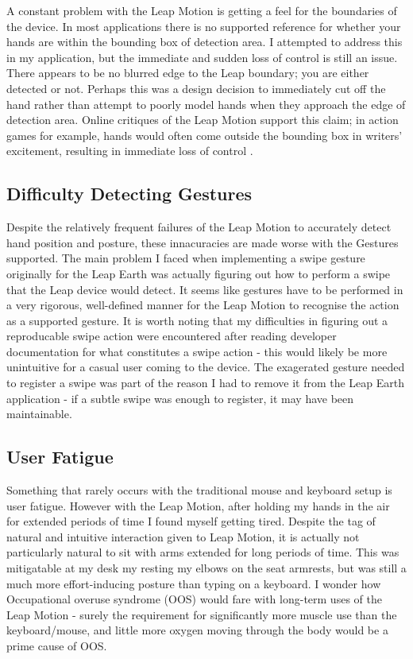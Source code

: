 \documentclass{sigplanconf}
\begin{document}
A constant problem with the Leap Motion is getting a feel for the boundaries of the device. In most applications there is no supported reference for whether your hands are within the bounding box of detection area. I attempted to address this in my application, but the immediate and sudden loss of control is still an issue. There appears to be no blurred edge to the Leap boundary; you are either detected or not. Perhaps this was a design decision to immediately cut off the hand rather than attempt to poorly model hands when they approach the edge of detection area. Online critiques of the Leap Motion support this claim; in action games for example, hands would often come outside the bounding box in writers' excitement, resulting in immediate loss of control \cite{}. 

\subsection{Difficulty Detecting Gestures}

Despite the relatively frequent failures of the Leap Motion to accurately detect hand position and posture, these innacuracies are made worse with the Gestures supported. The main problem I faced when implementing a swipe gesture originally for the Leap Earth was actually figuring out how to perform a swipe that the Leap device would detect. It seems like gestures have to be performed in a very rigorous, well-defined manner for the Leap Motion to recognise the action as a supported gesture. It is worth noting that my difficulties in figuring out a reproducable swipe action were encountered after reading developer documentation for what constitutes a swipe action - this would likely be more unintuitive for a casual user coming to the device. The exagerated gesture needed to register a swipe was part of the reason I had to remove it from the Leap Earth application - if a subtle swipe was enough to register, it may have been maintainable.

\subsection{User Fatigue}

Something that rarely occurs with the traditional mouse and keyboard setup is user fatigue. However with the Leap Motion, after holding my hands in the air for extended periods of time I found myself getting tired. Despite the tag of natural and intuitive interaction given to Leap Motion, it is actually not particularly natural to sit with arms extended for long periods of time. This was mitigatable at my desk my resting my elbows on the seat armrests, but was still a much more effort-inducing posture than typing on a keyboard. I wonder how Occupational overuse syndrome (OOS) would fare with long-term uses of the Leap Motion - surely the requirement for significantly more muscle use than the keyboard/mouse, and little more oxygen moving through the body would be a prime cause of OOS.
\end{document}
